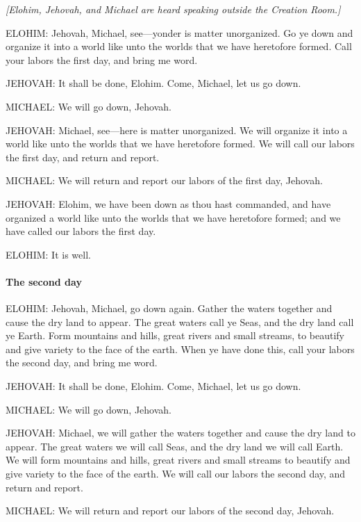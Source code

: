				\textit{[Elohim, Jehovah, and Michael are heard speaking outside the Creation Room.]}

				ELOHIM: Jehovah, Michael, see---yonder is matter unorganized. Go ye down and organize it into a world like unto the worlds that we have heretofore formed. Call your labors the first day, and bring me word.

				JEHOVAH: It shall be done, Elohim. Come, Michael, let us go down.

				MICHAEL: We will go down, Jehovah.

				JEHOVAH: Michael, see---here is matter unorganized. We will organize it into a world like unto the worlds that we have heretofore formed. We will call our labors the first day, and return and report.

				MICHAEL: We will return and report our labors of the first day, Jehovah.

				JEHOVAH: Elohim, we have been down as thou hast commanded, and have organized a world like unto the worlds that we have heretofore formed; and we have called our labors the first
				day.

				ELOHIM: It is well.
				
			\paragraph{The second day}
				\label{TEMPLE-ENDOWMENT-ENDOW-PRE-1990-DAY2}
			
				ELOHIM: Jehovah, Michael, go down again. Gather the waters together and cause the dry land to appear. The great waters call ye Seas, and the dry land call ye Earth. Form mountains and hills, great rivers and small streams, to beautify and give variety to the face of the earth. When ye have done this, call your labors the second day, and bring me word.

				JEHOVAH: It shall be done, Elohim. Come, Michael, let us go down.

				MICHAEL: We will go down, Jehovah.

				JEHOVAH: Michael, we will gather the waters together and cause the dry land to appear. The great waters we will call Seas, and the dry land we will call Earth. We will form mountains and hills, great rivers and small streams to beautify and give variety to the face of the earth. We will call our labors the second day, and return and report.

				MICHAEL: We will return and report our labors of the second day, Jehovah.


